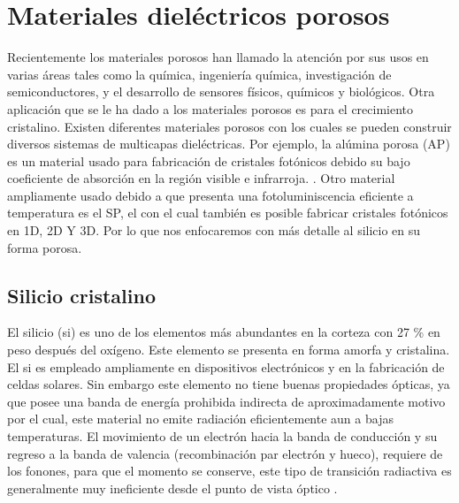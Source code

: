 \documentclass[a4paper,11pt,]{book}
\begin{document}
\section{ Materiales dieléctricos porosos}

Recientemente los materiales porosos han llamado la atención por sus usos en varias áreas tales como la química, ingeniería química, investigación de semiconductores, y el desarrollo de sensores físicos, químicos y biológicos. Otra aplicación que se le ha dado a los materiales porosos es para el crecimiento cristalino. Existen diferentes materiales porosos con los cuales se pueden construir diversos sistemas de multicapas dieléctricas. Por ejemplo, la alúmina porosa (AP) es un material usado para fabricación de cristales fotónicos debido su bajo coeficiente de absorción en la región visible e infrarroja. . Otro material ampliamente usado debido  a que presenta una fotoluminiscencia eficiente a temperatura es el SP, el con el cual también es posible fabricar cristales fotónicos en 1D, 2D Y 3D. Por lo que nos enfocaremos con más detalle al silicio  en su forma porosa.
\subsection{ Silicio cristalino}
El silicio (si) es uno de los elementos más abundantes en la corteza con 27 \% en peso después del oxígeno. Este elemento se presenta en forma amorfa y cristalina. El si es empleado ampliamente en dispositivos electrónicos y en la fabricación de celdas solares. Sin embargo este elemento no tiene buenas propiedades ópticas, ya que posee una banda de energía prohibida indirecta de aproximadamente  motivo por el cual, este material no emite radiación eficientemente aun a bajas temperaturas. El movimiento de un electrón hacia la banda de conducción y su regreso a la banda de valencia (recombinación par electrón y hueco), requiere de los fonones, para que el momento se conserve, este tipo de transición radiactiva es generalmente muy ineficiente desde el punto de vista óptico .
\end{document}
